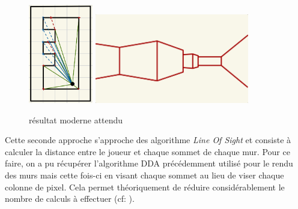 \documentclass[11pt]{article}
\begin{document}
\begin{figure}
	\center
	\includegraphics[width=0.25\textwidth]{image/projection-2D-V2.jpeg}
	\raisebox{2cm}{
		\hspace{2mm}$\Longrightarrow$\hspace{2mm}
	}
	\includegraphics[width=0.6\textwidth]{image/rendu-sans-texture.jpeg}
	\caption{résultat moderne attendu}
	\label{fig:result-modern}
\end{figure}

Cette seconde approche s'approche des algorithme \textit{Line Of Sight} et consiste à calculer la distance entre le 
joueur et chaque sommet de chaque mur.
Pour ce faire, on a pu récupérer l'algorithme DDA précédemment utilisé pour le rendu des murs mais cette fois-ci 
en visant chaque sommet au lieu de viser chaque colonne de pixel. Cela permet théoriquement de réduire considérablement 
le nombre de calculs à effectuer (cf: ).
\end{document}
